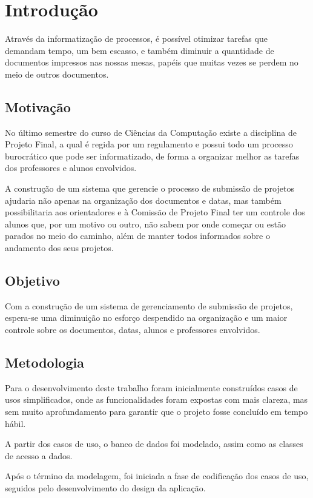 \chapter{Introdução}
Através da informatização de processos, é possível otimizar tarefas que demandam tempo, 
um bem escasso, e também diminuir a quantidade de documentos impressos nas nossas mesas, 
papéis que muitas vezes se perdem no meio de outros documentos.

\section{Motivação}
No último semestre do curso de Ciências da Computação existe a disciplina de Projeto Final, 
a qual é regida por um regulamento e possui todo um processo burocrático que pode ser informatizado, 
de forma a organizar melhor as tarefas dos professores e alunos envolvidos.

A construção de um sistema que gerencie o processo de submissão de projetos ajudaria 
não apenas na organização dos documentos e datas, mas também possibilitaria aos 
orientadores e à Comissão de Projeto Final ter um controle dos alunos que, por um 
motivo ou outro, não sabem por onde começar ou estão parados no meio do caminho, 
além de manter todos informados sobre o andamento dos seus projetos.

\section{Objetivo}
Com a construção de um sistema de gerenciamento de submissão de projetos, 
espera-se uma diminuição no esforço despendido na organização e um maior 
controle sobre os documentos, datas, alunos e professores envolvidos.

\section{Metodologia}

Para o desenvolvimento deste trabalho foram inicialmente construídos casos de usos 
simplificados, onde as funcionalidades foram expostas com mais clareza, mas sem 
muito aprofundamento para garantir que o projeto fosse concluído em tempo hábil. 

A partir dos casos de uso, o banco de dados foi modelado, assim como as classes 
de acesso a dados.

Após o término da modelagem, foi iniciada a fase de codificação dos casos de uso, 
seguidos pelo desenvolvimento do design da aplicação.

